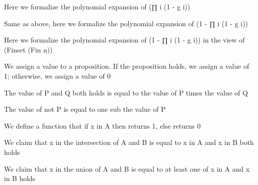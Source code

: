 \begin{lemma}\label{mul_expand₃}
                Here we formalize the polynomial expansion of (∏ i (1 - g i))
    \end{lemma}

\begin{lemma}\label{mul_expand₂}
                Same as above, here we formalize the polynomial expansion of (1 - ∏ i (1 - g i))
    \end{lemma}

\begin{lemma}\label{mul_expand₁}
                Here we formalize the polynomial expansion of (1 - ∏ i (1 - g i)) in the view of (Finset (Fin n))
    \end{lemma}

\begin{definition}\label{toInt}
        \leanok
                We assign a value to a proposition. If the proposition holds, we assign a value of 1; otherwise, we assign a value of 0
    \end{definition}

\begin{lemma}\label{toInt_and}
                The value of P and Q both holds is equal to the value of P times the value of Q
    \end{lemma}

\begin{lemma}\label{toInt_not}
                The value of not P is equal to one sub the value of P
    \end{lemma}

\begin{definition}\label{char_fun}
        \leanok
                We define a function that if x in A then returns 1, else returns 0
    \end{definition}

\begin{lemma}\label{char_fun_inter}
                We claim that x in the intersection of A and B is equal to x in A and x in B both holds
    \end{lemma}

\begin{lemma}\label{char_fun_union}
                We claim that x in the union of A and B is equal to at least one of x in A and x in B holds
    \end{lemma}

